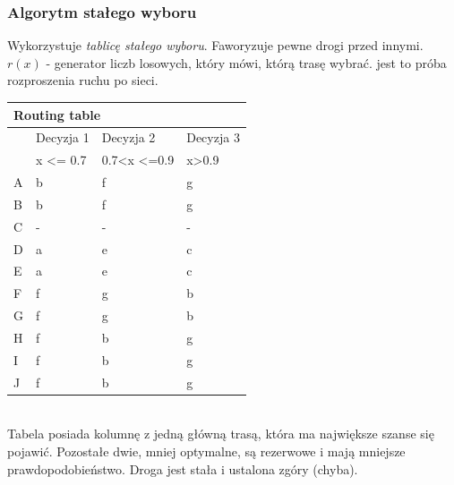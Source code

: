 			\subsubsection{Algorytm stałego wyboru}
				Wykorzystuje \textit{tablicę stałego wyboru}. Faworyzuje pewne drogi przed innymi. \\
				$ r(x) $ - generator liczb losowych, który mówi, którą trasę wybrać. jest to próba rozproszenia ruchu po sieci.\\
				\begin{tabular}{llll}
					\multicolumn{4}{l}{Routing table}                                                                                                  \\ \hline
					\multicolumn{1}{l|}{}  & \multicolumn{1}{l|}{Decyzja 1}         & \multicolumn{1}{l|}{Decyzja 2}                            &  \multicolumn{1}{l|}{Decyzja 3}              \\ \hline
					\multicolumn{1}{l|}{}  & \multicolumn{1}{l|}{x \textless= 0.7} & \multicolumn{1}{l|}{0.7\textless x \textless=0.9} & x\textgreater0.9 \\ \hline
					\multicolumn{1}{l|}{A} & \multicolumn{1}{l|}{b}                & \multicolumn{1}{l|}{f}                           & g               \\
					\multicolumn{1}{l|}{B} & \multicolumn{1}{l|}{b}                & \multicolumn{1}{l|}{f}                           & g               \\
					\multicolumn{1}{l|}{C} & \multicolumn{1}{l|}{-}                & \multicolumn{1}{l|}{-}                           & -              \\
					\multicolumn{1}{l|}{D} & \multicolumn{1}{l|}{a}                & \multicolumn{1}{l|}{e}                           & c              \\
					\multicolumn{1}{l|}{E} & \multicolumn{1}{l|}{a}                & \multicolumn{1}{l|}{e}                           & c              \\
					\multicolumn{1}{l|}{F} & \multicolumn{1}{l|}{f}                & \multicolumn{1}{l|}{g}                           & b               \\
					\multicolumn{1}{l|}{G} & \multicolumn{1}{l|}{f}                & \multicolumn{1}{l|}{g}                           & b               \\
					\multicolumn{1}{l|}{H} & \multicolumn{1}{l|}{f}                & \multicolumn{1}{l|}{b}                           & g               \\
					\multicolumn{1}{l|}{I} & \multicolumn{1}{l|}{f}                & \multicolumn{1}{l|}{b}                           & g               \\
					\multicolumn{1}{l|}{J} & \multicolumn{1}{l|}{f}                & \multicolumn{1}{l|}{b}                           & g              
				\end{tabular}\\
				Tabela posiada kolumnę z jedną główną trasą, która ma największe szanse się pojawić. Pozostałe dwie, mniej optymalne, są rezerwowe i mają mniejsze prawdopodobieństwo. Droga jest stała i ustalona  zgóry (chyba).
